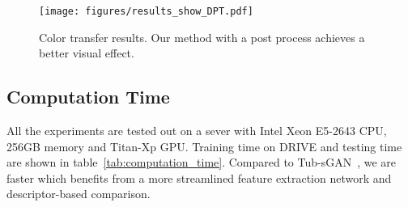 \documentclass[letterpaper]{article} %
\begin{document}
        
        
        
        
    
    
    
    

	\begin{figure}[h!]
		\begin{center}
			\texttt{[image: figures/results\_show\_DPT.pdf]}
		\end{center}
		\caption{Color transfer results. Our method with a post process achieves a better visual effect. }
		\label{fig:results_show_DPT}
	\end{figure}
	
	\subsection{Computation Time}

	All the experiments are tested out on a sever with Intel Xeon E5-2643 CPU, 256GB memory and Titan-Xp GPU. Training time on DRIVE and testing time are shown in table~\ref{tab:computation_time}. Compared to Tub-sGAN~\cite{zhao2018synthesizing}, we are faster which benefits from a more streamlined feature extraction network and descriptor-based comparison.
	
\end{document}
